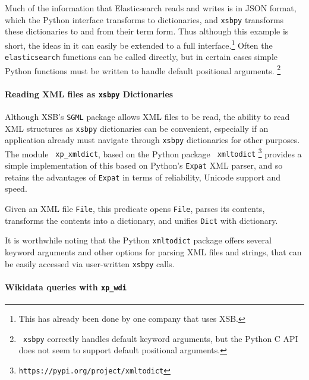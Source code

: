 Much of the information that Elasticsearch reads and writes is in JSON
format, which the Python interface transforms to dictionaries, and
{\tt xsbpy} transforms these dictionaries to and from their term form.
Thus although this example is short, the ideas in it can easily be
extended to a full interface.\footnote{This has already been done by
  one company that uses XSB.}  Often the {\tt elasticsearch} functions
can be called directly, but in certain cases simple Python functions
must be written to handle default positional arguments. \footnote{{\tt
    xsbpy} correctly handles default keyword arguments, but the Python
  C API does not seem to support default positional arguments.}



\paragraph{Reading XML files as {\tt xsbpy} Dictionaries}
%
Although XSB's {\tt SGML} package allows XML files to be read, the
ability to read XML structures as {\tt xsbpy} dictionaries can be
convenient, especially if an application already must navigate through
{\tt xsbpy} dictionaries for other purposes.  The module {\tt
  xp\_xmldict}, based on the Python package {\tt
  xmltodict} \footnote{{\tt https://pypi.org/project/xmltodict}}
provides a simple implementation of this based on Python's {\tt Expat}
XML parser, and so retains the advantages of {\tt Expat} in terms of
reliability, Unicode support and speed.

\begin{description}
  
  Given an XML file {\tt File}, this predicate opens {\tt File},
  parses its contents, transforms the contents into a dictionary, and
  unifies {\tt Dict} with dictionary.  
\end{description}

\noindent
It is worthwhile noting that the Python {\tt xmltodict} package offers
several keyword arguments and other options for parsing XML files and
strings, that can be easily accessed via user-written {\tt xsbpy}
calls.

\paragraph{Wikidata queries with {\tt xp\_wdi}}

